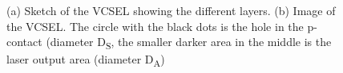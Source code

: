 	\begin{figure}[tp]
		\begin{subfigure}[t]{ 0.49\linewidth}
			\centering
			\caption{}
			\label{subfig::vcsel_sketch}
		\end{subfigure}
		\hfill
		\begin{subfigure}[t]{ 0.49\linewidth}
			\centering
			\caption{}
			\label{subfig::vcsel_output_area}
		\end{subfigure}
		\caption{(a) Sketch of the VCSEL showing the different layers. (b) Image of the VCSEL. The circle with the black dots is the hole in the p-contact (diameter D\textsubscript{S}, the smaller darker area in the middle is the laser output area (diameter D\textsubscript{A})}
		\label{fig::<fig>}
	\end{figure}

